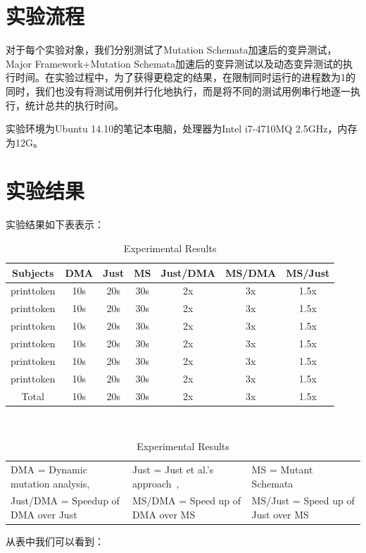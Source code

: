 \documentclass[nofonts]{ctexrep}
\begin{document}
\section{实验流程}
对于每个实验对象，我们分别测试了Mutation Schemata加速后的变异测试，Major Framework+Mutation Schemata加速后的变异测试以及动态变异测试的执行时间。在实验过程中，为了获得更稳定的结果，在限制同时运行的进程数为1的同时，我们也没有将测试用例并行化地执行，而是将不同的测试用例串行地逐一执行，统计总共的执行时间。

实验环境为Ubuntu 14.10的笔记本电脑，处理器为Intel i7-4710MQ 2.5GHz，内存为12G。
\section{实验结果}
实验结果如下表表示：

\begin{table}[t]
  \centering
  \caption{Experimental Results}
  \label{tab:results}
  \begin{tabular}{|c|c|c|c|c|c|c|}
    \hline
    Subjects & DMA & Just & MS & Just/DMA & MS/DMA & MS/Just\\
    \hline
    printtoken & 10s & 20s & 30s & 2x & 3x & 1.5x\\
    printtoken & 10s & 20s & 30s & 2x & 3x & 1.5x\\
    printtoken & 10s & 20s & 30s & 2x & 3x & 1.5x\\
    printtoken & 10s & 20s & 30s & 2x & 3x & 1.5x\\
    printtoken & 10s & 20s & 30s & 2x & 3x & 1.5x\\
    printtoken & 10s & 20s & 30s & 2x & 3x & 1.5x\\
    \hline
    Total & 10s & 20s & 30s & 2x & 3x & 1.5x\\
    \hline
  \end{tabular}\\
  \begin{tabular}{lll}
  DMA = Dynamic mutation analysis, & Just = Just et al.'s
                                     approach~\cite{just2014efficient},
    & MS = Mutant Schemata~\cite{untch1993mutation} \\
    Just/DMA = Speedup of DMA over Just & MS/DMA = Speed up of DMA
                                          over MS & MS/Just = Speed up
                                                    of Just over MS
  \end{tabular}
\end{table}

从表中我们可以看到：
\end{document}
